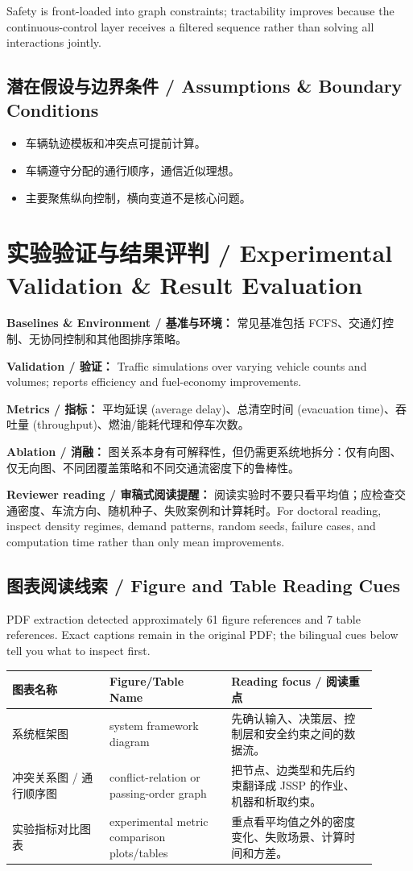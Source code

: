\documentclass[UTF8,a4paper,11pt,fontset=fandol]{ctexart}
\begin{document}
Safety is front-loaded into graph constraints; tractability improves because the continuous-control layer receives a filtered sequence rather than solving all interactions jointly.

\subsection{潜在假设与边界条件 / Assumptions \& Boundary Conditions}
\begin{itemize}
\item 车辆轨迹模板和冲突点可提前计算。
\item 车辆遵守分配的通行顺序，通信近似理想。
\item 主要聚焦纵向控制，横向变道不是核心问题。
\end{itemize}


\section{实验验证与结果评判 / Experimental Validation \& Result Evaluation}
\textbf{Baselines \& Environment / 基准与环境：} 常见基准包括 FCFS、交通灯控制、无协同控制和其他图排序策略。

\textbf{Validation / 验证：} Traffic simulations over varying vehicle counts and volumes; reports efficiency and fuel-economy improvements.

\textbf{Metrics / 指标：} 平均延误 (average delay)、总清空时间 (evacuation time)、吞吐量 (throughput)、燃油/能耗代理和停车次数。

\textbf{Ablation / 消融：} 图关系本身有可解释性，但仍需更系统地拆分：仅有向图、仅无向图、不同团覆盖策略和不同交通流密度下的鲁棒性。

\textbf{Reviewer reading / 审稿式阅读提醒：} 阅读实验时不要只看平均值；应检查交通密度、车流方向、随机种子、失败案例和计算耗时。For doctoral reading, inspect density regimes, demand patterns, random seeds, failure cases, and computation time rather than only mean improvements.

\subsection{图表阅读线索 / Figure and Table Reading Cues}
PDF extraction detected approximately 61 figure references and 7 table references. Exact captions remain in the original PDF; the bilingual cues below tell you what to inspect first.

\begin{longtable}{p{0.24\linewidth}p{0.30\linewidth}p{0.36\linewidth}}
\toprule
图表名称 & Figure/Table Name & Reading focus / 阅读重点\\
\midrule
系统框架图 & system framework diagram & 先确认输入、决策层、控制层和安全约束之间的数据流。 \\
冲突关系图 / 通行顺序图 & conflict-relation or passing-order graph & 把节点、边类型和先后约束翻译成 JSSP 的作业、机器和析取约束。 \\
实验指标对比图表 & experimental metric comparison plots/tables & 重点看平均值之外的密度变化、失败场景、计算时间和方差。 \\
\bottomrule
\end{longtable}
\end{document}
